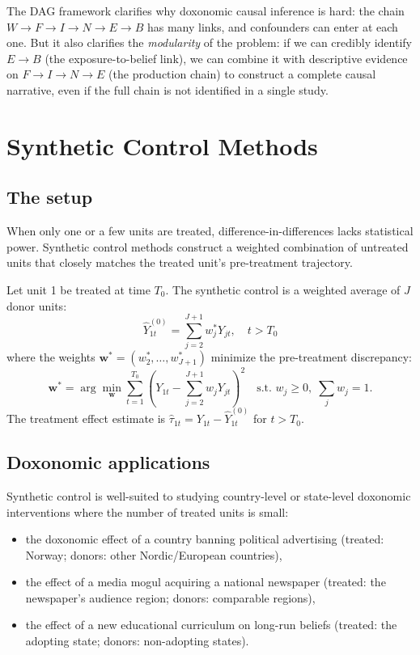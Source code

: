 The DAG framework clarifies why doxonomic causal inference is hard: the chain $W \to F \to I \to N \to E \to B$ has many links, and confounders can enter at each one.
But it also clarifies the \emph{modularity} of the problem: if we can credibly identify $E \to B$ (the exposure-to-belief link), we can combine it with descriptive evidence on $F \to I \to N \to E$ (the production chain) to construct a complete causal narrative, even if the full chain is not identified in a single study.

\section{Synthetic Control Methods}
\label{sec:ch16-synth}

\subsection{The setup}

When only one or a few units are treated, difference-in-differences lacks statistical power.
Synthetic control methods \autocite{abadie2010} construct a weighted combination of untreated units that closely matches the treated unit's pre-treatment trajectory.

\begin{definition}
\label{def:synth-control}
Let unit 1 be treated at time $T_0$.
The synthetic control is a weighted average of $J$ donor units:
\[
  \hat{Y}_{1t}^{(0)} = \sum_{j=2}^{J+1} w_j^* Y_{jt}, \quad t > T_0
\]
where the weights $\mathbf{w}^* = (w_2^*, \ldots, w_{J+1}^*)$ minimize the pre-treatment discrepancy:
\[
  \mathbf{w}^* = \arg\min_{\mathbf{w}} \sum_{t=1}^{T_0} \left( Y_{1t} - \sum_{j=2}^{J+1} w_j Y_{jt} \right)^2 \quad \text{s.t.\ } w_j \geq 0, \; \sum_j w_j = 1.
\]
The treatment effect estimate is $\hat{\tau}_{1t} = Y_{1t} - \hat{Y}_{1t}^{(0)}$ for $t > T_0$.
\end{definition}

\subsection{Doxonomic applications}

Synthetic control is well-suited to studying country-level or state-level doxonomic interventions where the number of treated units is small:
\begin{itemize}[nosep]
  \item the doxonomic effect of a country banning political advertising (treated: Norway; donors: other Nordic/European countries),
  \item the effect of a media mogul acquiring a national newspaper (treated: the newspaper's audience region; donors: comparable regions),
  \item the effect of a new educational curriculum on long-run beliefs (treated: the adopting state; donors: non-adopting states).
\end{itemize}

